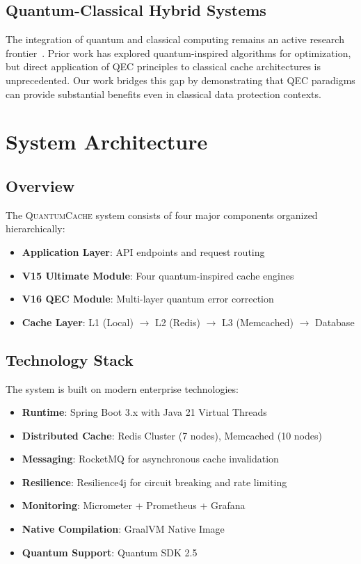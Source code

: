 \documentclass[12pt,a4paper]{article}
\theoremstyle{definition}
\newcommand{\QuantumCache}{\textsc{QuantumCache}}
\begin{document}
\subsection{Quantum-Classical Hybrid Systems}
The integration of quantum and classical computing remains an active research frontier~\cite{ref3}. Prior work has explored quantum-inspired algorithms for optimization, but direct application of QEC principles to classical cache architectures is unprecedented. Our work bridges this gap by demonstrating that QEC paradigms can provide substantial benefits even in classical data protection contexts.

\section{System Architecture}\label{sec:architecture}

\subsection{Overview}
The \QuantumCache{} system consists of four major components organized hierarchically:
\begin{itemize}
    \item \textbf{Application Layer}: API endpoints and request routing
    \item \textbf{V15 Ultimate Module}: Four quantum-inspired cache engines
    \item \textbf{V16 QEC Module}: Multi-layer quantum error correction
    \item \textbf{Cache Layer}: L1 (Local) $\rightarrow$ L2 (Redis) $\rightarrow$ L3 (Memcached) $\rightarrow$ Database
\end{itemize}

\subsection{Technology Stack}
The system is built on modern enterprise technologies:
\begin{itemize}
    \item \textbf{Runtime}: Spring Boot 3.x with Java 21 Virtual Threads
    \item \textbf{Distributed Cache}: Redis Cluster (7 nodes), Memcached (10 nodes)
    \item \textbf{Messaging}: RocketMQ for asynchronous cache invalidation
    \item \textbf{Resilience}: Resilience4j for circuit breaking and rate limiting
    \item \textbf{Monitoring}: Micrometer + Prometheus + Grafana
    \item \textbf{Native Compilation}: GraalVM Native Image
    \item \textbf{Quantum Support}: Quantum SDK 2.5
\end{itemize}
\end{document}
